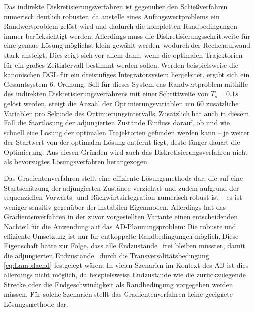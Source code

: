 Das indirekte Diskretisierungsverfahren ist gegenüber den Schießverfahren numerisch deutlich robuster, da anstelle eines Anfangswertproblems ein Randwertproblem gelöst wird und dadurch die kompletten Randbedingungen immer berücksichtigt werden. Allerdings muss die Diskretisierungsschrittweite für eine genaue Lösung möglichst klein gewählt werden, wodurch der Rechenaufwand stark ansteigt. Dies zeigt sich vor allem dann, wenn die optimalen Trajektorien für ein großes Zeitintervall bestimmt werden sollen. Werden beispielsweise die kanonischen \gls{DGL} für ein dreistufiges Integratorsystem hergeleitet, ergibt sich ein Gesamtsystem 6. Ordnung. Soll für dieses System das Randwertproblem mithilfe des indirekten Diskretisierungsverfahrens mit einer Schrittweite von $T_s = 0.1\unit{s}$ gelöst werden, steigt die Anzahl der Optimierungsvariablen um 60 zusätzliche Variablen pro Sekunde des Optimierungsintervalls. Zusätzlich hat auch in diesem Fall die Startlösung der adjungierten Zustände Einfluss darauf, ob und wie schnell eine Lösung der optimalen Trajektorien gefunden werden kann -- je weiter der Startwert von der optimalen Lösung entfernt liegt, desto länger dauert die Optimierung. Aus diesen Gründen wird auch das Diskretisierungsverfahren nicht als bevorzugtes Lösungsverfahren herangezogen. 

Das Gradientenverfahren stellt eine effiziente Lösungsmethode dar, die auf eine Startschätzung der adjungierten Zustände verzichtet und zudem aufgrund der sequenziellen Vorwärts- und Rückwärtsintegration numerisch robust ist -- es ist weniger sensitiv gegenüber der instabilen Eigenmoden. Allerdings hat das Gradientenverfahren in der zuvor vorgestellten Variante einen entscheidenden Nachteil für die Anwendung auf das \gls{AD}-Plaunungsproblem: Die robuste und effiziente Umsetzung ist nur für entkoppelte Randbedingungen möglich. Diese Eigenschaft hätte zur Folge, dass alle Endzustände \xoftf~frei bleiben müssten, damit die adjungierten Endzustände \lambdaoftf~durch die Transversalitätsbedingung \eqref{eq:Lambdaend} festgelegt wären. In vielen Szenarien im Kontext des \gls{AD} ist dies allerdings nicht möglich, da beispielsweise Endzustände wie die zurückzulegende Strecke oder die Endgeschwindigkeit als Randbedingung vorgegeben werden müssen. Für solche Szenarien stellt das Gradientenverfahren keine geeignete Lösungsmethode dar. 

